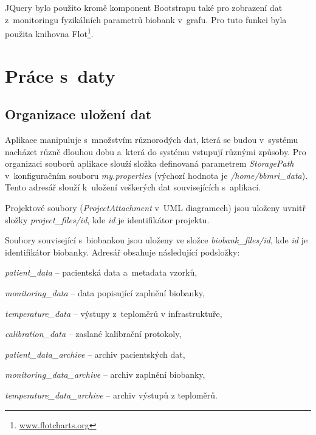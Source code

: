\documentclass[11pt, final, oneside]{fithesis2}
\begin{document}
JQuery bylo použito kromě komponent Bootstrapu také pro zobrazení dat z~monitoringu fyzikálních parametrů biobank v~grafu. Pro tuto funkci byla použita knihovna Flot\footnote{\url{www.flotcharts.org}}. 


\section{Práce s~daty}

\subsection{Organizace uložení dat}\label{chapter:implementation:subsection:organizationOfDataStorage}
Aplikace manipuluje s~množstvím různorodých dat, která se budou v~systému nacházet různě dlouhou dobu a~která do systému vstupují různými způsoby. Pro organizaci souborů aplikace slouží složka definovaná parametrem \textit{StoragePath} v~konfiguračním souboru \textit{my.properties} (výchozí hodnota je \textit{/home/bbmri\_data}). Tento adresář slouží k~uložení veškerých dat souvisejících s~aplikací.

Projektové soubory (\textit{ProjectAttachment} v~UML diagramech) jsou uloženy uvnitř složky \textit{project\_files/id}, kde \textit{id} je identifikátor projektu. 

Soubory související s~biobankou jsou uloženy ve složce \textit{biobank\_files/id}, kde \textit{id} je identifikátor biobanky. Adresář obsahuje následující podsložky: 
\begin{compactitem}
	\item \textit{patient\_data} -- pacientská data a~metadata vzorků,
	\item \textit{monitoring\_data} -- data popisující zaplnění biobanky,
	\item \textit{temperature\_data} -- výstupy z~teploměrů v infrastruktuře,
	\item \textit{calibration\_data} -- zaslané kalibrační protokoly,
	\item \textit{patient\_data\_archive} -- archiv pacientských dat,
	\item \textit{monitoring\_data\_archive} -- archiv zaplnění biobanky,
	\item \textit{temperature\_data\_archive} -- archiv výstupů z teploměrů.
\end{compactitem}
\end{document}

